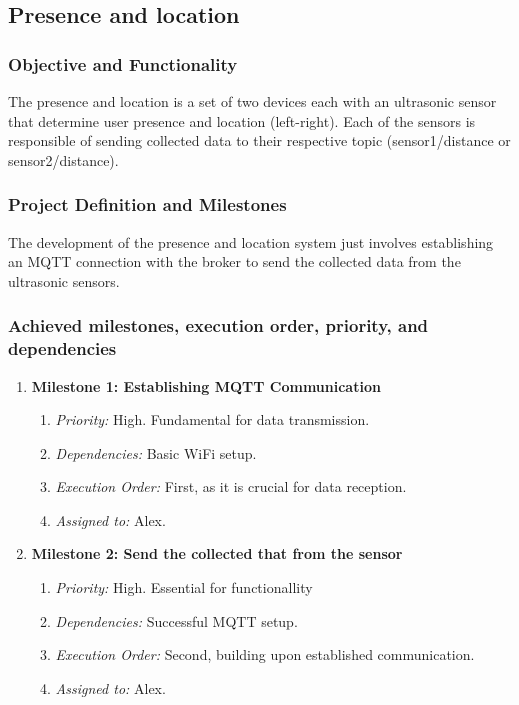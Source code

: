 \subsection{Presence and location}

\subsubsection{Objective and Functionality}
The presence and location is a set of two devices each with an ultrasonic sensor that determine user presence and location (left-right). Each of the sensors is responsible of sending collected data to their respective topic (sensor1/distance or sensor2/distance).

\subsubsection{Project Definition and Milestones}
The development of the presence and location system just involves establishing an MQTT connection with the broker to send the collected data from the ultrasonic sensors.

\subsubsection{Achieved milestones, execution order, priority, and dependencies}
\begin{enumerate}
    \item \textbf{Milestone 1: Establishing MQTT Communication}
        \begin{enumerate}
            \item \textit{Priority:} High. Fundamental for data transmission.
            \item \textit{Dependencies:} Basic WiFi setup.
            \item \textit{Execution Order:} First, as it is crucial for data reception.
            \item \textit{Assigned to:} Alex.
        \end{enumerate}

    \item \textbf{Milestone 2: Send the collected that from the sensor}
        \begin{enumerate}
            \item \textit{Priority:} High. Essential for functionallity
            \item \textit{Dependencies:} Successful MQTT setup.
            \item \textit{Execution Order:} Second, building upon established communication.
            \item \textit{Assigned to:} Alex.
        \end{enumerate}
\end{enumerate}

